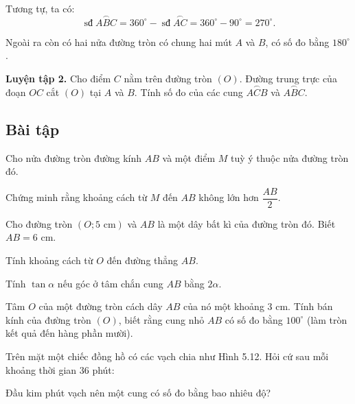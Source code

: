 \begin{lesson}
    Tương tự, ta có:
    \[
        \operatorname{sđ}\overset{\frown}{ABC}
        =360^\circ-\operatorname{sđ}\overset{\frown}{AC}
        =360^\circ-90^\circ=270^\circ.
    \]

    Ngoài ra còn có hai nửa đường tròn có chung hai mút $A$ và $B$, có số đo bằng $180^\circ$.

    \textbf{Luyện tập 2.} Cho điểm $C$ nằm trên đường tròn $(O)$. Đường trung trực của đoạn $OC$ cắt $(O)$ tại $A$ và $B$. Tính số đo của các cung $\overset{\frown}{ACB}$ và $\overset{\frown}{ABC}$.

    \answerline
    \answerline
\end{lesson}

\begin{exercises}
    \subsection{Bài tập}

    \begin{questions}[resume=SGK]
        \item Cho nửa đường tròn đường kính $AB$ và một điểm $M$ tuỳ ý thuộc nửa đường tròn đó.

        Chứng minh rằng khoảng cách từ $M$ đến $AB$ không lớn hơn $\dfrac{AB}{2}$.

        \answerline
        \answerline

        \item Cho đường tròn $(O;5\text{ cm})$ và $AB$ là một dây bất kì của đường tròn đó. Biết $AB=6$ cm.
        \begin{questions}
            \item Tính khoảng cách từ $O$ đến đường thẳng $AB$.

            \answerline
            \item Tính $\tan\alpha$ nếu góc ở tâm chắn cung $AB$ bằng $2\alpha$.

            \answerline
        \end{questions}

        \item Tâm $O$ của một đường tròn cách dây $AB$ của nó một khoảng $3$ cm. Tính bán kính của đường tròn $(O)$, biết rằng cung nhỏ $AB$ có số đo bằng $100^\circ$ (làm tròn kết quả đến hàng phần mười).

        \answerline
        \answerline

        \item Trên mặt một chiếc đồng hồ có các vạch chia như Hình 5.12. Hỏi cứ sau mỗi khoảng thời gian $36$ phút:
        \begin{questions}
            \item Đầu kim phút vạch nên một cung có số đo bằng bao nhiêu độ?


\end{questions}
\end{questions}
\end{exercises}
